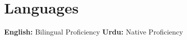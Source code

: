 \documentclass[]{resume-openfont}
\newcommand{\freelanceHeading}[3]{\runsubsection{#1}\hspace*{\fill}  \location{#2 | #3}\\}
\begin{document}
\section{Languages}
\textbf{English:} Bilingual Proficiency \textbullet{} \textbf{Urdu:} Native Proficiency

\end{document}
